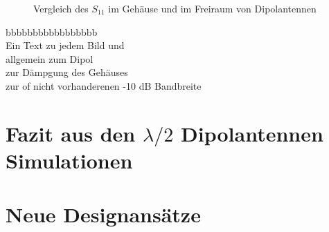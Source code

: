 %	

%	

\begin{figure}[!ht]
	\centering
	\begingroup
	
	\endgroup
	\caption{Vergleich des $S_{11}$ im Gehäuse und im Freiraum von Dipolantennen }
	\label{S11_Vergleich_Simulation_1mm_Dach}
\end{figure}

bbbbbbbbbbbbbbbbb\\
Ein Text zu jedem Bild und\\
allgemein zum Dipol\\
zur Dämpgung des Gehäuses\\
zur of nicht vorhanderenen -10 dB Bandbreite

\section{Fazit aus den $\lambda/2$ Dipolantennen Simulationen}

\newpage 
\thispagestyle{empty}
\newpage 
\section{Neue Designansätze}